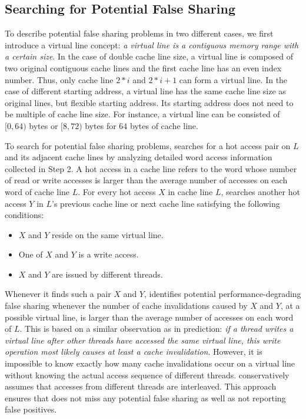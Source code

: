\subsection{Searching for Potential False Sharing}
\label{sec:evaluatingfs}
To describe potential false sharing problems in two different cases, 
we first introduce a virtual line concept:
{\it a virtual line is a contiguous memory range with a certain size}.
In the case of double cache line size, a virtual line 
is composed of two original 
contiguous cache lines and the first cache line has an even index number.
Thus, only cache line $2*i$ and $2*i+1$ can form a virtual line.
In the case of different starting address,
a virtual line has the same cache line size as original lines, but
flexible starting address.
Its starting address does not need to be multiple of cache line size.
For instance, a virtual line can be consisted of $[0,64)$ bytes or $[8,72)$ bytes 
for $64$ bytes of cache line.

To search for potential false sharing problems, 
\Predator{} searches for a hot access pair on $L$ and its adjacent cache lines 
by analyzing detailed word access information collected in Step 2. 
A hot access in a cache line refers to the word whose number of read or write accesses 
is larger than the average number of accesses on each word of cache line $L$.
For every hot access $X$ in cache line $L$, \Predator{} searches another
hot access $Y$ in $L$'s previous cache line or next cache line satisfying
the following conditions: 

\begin{itemize}
\item
$X$ and $Y$ reside on the same virtual line. 

\item
One of $X$ and $Y$ is a write access.

\item 
$X$ and $Y$ are issued by different threads.

\end{itemize}

Whenever it finds such a pair $X$ and $Y$, 
\Predator{} identifies potential performance-degrading false sharing whenever
 the number of cache invalidations caused by $X$ and $Y$, at a possible virtual line, 
is larger than the average number of accesses on each word of $L$. 
This is based on a similar observation as in prediction:
{\it if a thread writes a virtual line after other threads 
have accessed the same virtual line, this write operation most likely causes at least a cache 
invalidation}. 
However, it is impossible to know exactly how many cache invalidations occur on a virtual
line without knowing the actual access sequence of different threads.  
\Predator{} conservatively assumes that 
accesses from different threads are interleaved.
This approach ensures that \Predator{} does not miss any potential false sharing as well as 
not reporting false positives.

